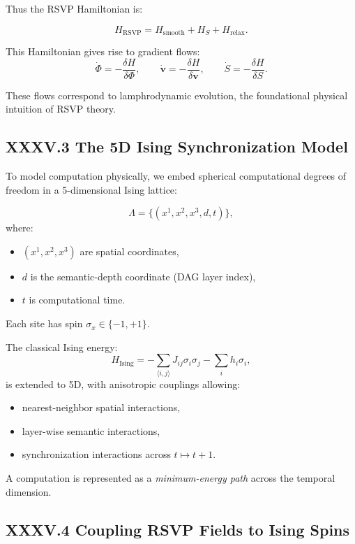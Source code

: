 \documentclass[11pt,letterpaper]{article}
\begin{document}
Thus the RSVP Hamiltonian is:

\[
\boxed{
H_{\text{RSVP}}
= H_{\text{smooth}} + H_S + H_{\text{relax}}.
}
\]

This Hamiltonian gives rise to gradient flows:
\[
\dot{\Phi} = -\frac{\delta H}{\delta \Phi}, \qquad
\dot{\mathbf{v}} = -\frac{\delta H}{\delta \mathbf{v}}, \qquad
\dot{S} = -\frac{\delta H}{\delta S}.
\]

These flows correspond to lamphrodynamic evolution, 
the foundational physical intuition of RSVP theory.

\subsection{XXXV.3 The 5D Ising Synchronization Model}

To model computation physically, we embed spherical computational degrees of freedom 
in a 5-dimensional Ising lattice:

\[
\Lambda = \{(x^1,x^2,x^3,d,t)\},
\]
where:

\begin{itemize}
  \item $(x^1,x^2,x^3)$ are spatial coordinates,
  \item $d$ is the semantic-depth coordinate (DAG layer index),
  \item $t$ is computational time.
\end{itemize}

Each site has spin $\sigma_{x} \in \{-1, +1\}$.  

The classical Ising energy:
\[
H_{\text{Ising}}
=
-\sum_{\langle i,j\rangle} J_{ij} \sigma_i \sigma_j
- \sum_i h_i \sigma_i,
\]
is extended to 5D, with anisotropic couplings allowing:

\begin{itemize}
    \item nearest-neighbor spatial interactions,
    \item layer-wise semantic interactions,
    \item synchronization interactions across $t \mapsto t+1$.
\end{itemize}

A computation is represented as a \emph{minimum-energy path} across the temporal dimension.

\subsection{XXXV.4 Coupling RSVP Fields to Ising Spins}
\end{document}
